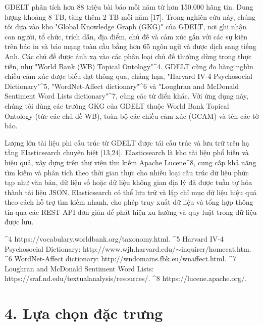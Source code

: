 GDELT phân tích hơn 88 triệu bài báo mỗi năm từ hơn 150.000 hãng tin. Dung lượng khoảng 8 TB, tăng thêm 2 TB mỗi năm {[}17{]}. Trong nghiên cứu này, chúng tôi dựa vào kho "Global Knowledge Graph (GKG)" của GDELT, nơi ghi nhận con người, tổ chức, trích dẫn, địa điểm, chủ đề và cảm xúc gắn với các sự kiện trên báo in và báo mạng toàn cầu bằng hơn 65 ngôn ngữ và được dịch sang tiếng Anh. Các chủ đề được ánh xạ vào các phân loại chủ đề thường dùng trong thực tiễn, như "World Bank (WB) Topical Ontology"\^{}4. GDELT cũng đo hàng nghìn chiều cảm xúc được biểu đạt thông qua, chẳng hạn, "Harvard IV-4 Psychosocial Dictionary"\^{}5, "WordNet-Affect dictionary"\^{}6 và "Loughran and McDonald Sentiment Word Lists dictionary"\^{}7, cùng các từ điển khác. Với ứng dụng này, chúng tôi dùng các trường GKG của GDELT thuộc World Bank Topical Ontology (tức các chủ đề WB), toàn bộ các chiều cảm xúc (GCAM) và tên các tờ báo.

Lượng lớn tài liệu phi cấu trúc từ GDELT được tái cấu trúc và lưu trữ trên hạ tầng Elasticsearch chuyên biệt {[}13,24{]}. Elasticsearch là kho tài liệu phổ biến và hiệu quả, xây dựng trên thư viện tìm kiếm Apache Lucene\^{}8, cung cấp khả năng tìm kiếm và phân tích theo thời gian thực cho nhiều loại cấu trúc dữ liệu phức tạp như văn bản, dữ liệu số hoặc dữ liệu không gian địa lý đã được tuần tự hóa thành tài liệu JSON. Elasticsearch có thể lưu trữ và lập chỉ mục dữ liệu hiệu quả theo cách hỗ trợ tìm kiếm nhanh, cho phép truy xuất dữ liệu và tổng hợp thông tin qua các REST API đơn giản để phát hiện xu hướng và quy luật trong dữ liệu được lưu.

\^{}4 https://vocabulary.worldbank.org/taxonomy.html. \^{}5 Harvard IV-4 Psychosocial Dictionary: http://www.wjh.harvard.edu/\ensuremath{\sim}inquirer/homecat.htm. \^{}6 WordNet-Affect dictionary: http://wndomains.fbk.eu/wnaffect.html. \^{}7 Loughran and McDonald Sentiment Word Lists: https://sraf.nd.edu/textualanalysis/resources/. \^{}8 https://lucene.apache.org/.

\section{4. Lựa chọn đặc trưng}

